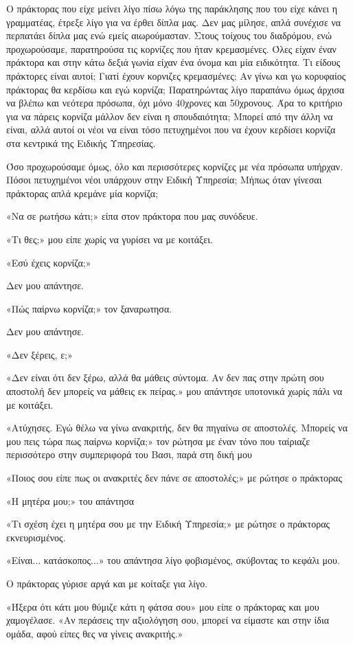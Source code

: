 \documentclass[12pt,twoside, openany]{book}
\begin{document}
Ο πράκτορας που είχε μείνει λίγο πίσω λόγω της παράκλησης που του είχε κάνει η γραμματέας, έτρεξε λίγο για να έρθει δίπλα μας. Δεν μας μίλησε, απλά συνέχισε να περπατάει δίπλα μας ενώ εμείς αιωρούμασταν. Στους τοίχους του διαδρόμου, ενώ προχωρούσαμε, παρατηρούσα τις κορνίζες που ήταν κρεμασμένες. Όλες είχαν έναν πράκτορα και στην κάτω δεξιά γωνία είχαν ένα όνομα και μία ειδικότητα. Τι είδους πράκτορες είναι αυτοί; Γιατί έχουν κορνιζες κρεμασμένες; Αν γίνω και γω κορυφαίος πράκτορας θα κερδίσω και εγώ κορνίζα; Παρατηρώντας λίγο παραπάνω όμως άρχισα να βλέπω και νεότερα πρόσωπα, όχι μόνο 40χρονες και 50χρονους. Άρα το κριτήριο για να πάρεις κορνίζα μάλλον δεν είναι η σπουδαιότητα; Μπορεί από την άλλη να είναι, αλλά αυτοί οι νέοι να είναι τόσο πετυχημένοι που να έχουν κερδίσει κορνίζα στα κεντρικά της Ειδικής Υπηρεσίας.

Όσο προχωρούσαμε όμως, όλο και περισσότερες κορνίζες με νέα πρόσωπα υπήρχαν. Πόσοι πετυχημένοι νέοι υπάρχουν στην Ειδική Υπηρεσία; Μήπως όταν γίνεσαι πράκτορας απλά κρεμάνε μία κορνίζα;

«Να σε ρωτήσω κάτι;» είπα στον πράκτορα που μας συνόδευε.

«Τι θες;» μου είπε χωρίς να γυρίσει να με κοιτάξει.

«Εσύ έχεις κορνίζα;»

Δεν μου απάντησε.

«Πώς παίρνω κορνίζα;» τον ξαναρωτησα.

Δεν μου απάντησε.

«Δεν ξέρεις, ε;»

«Δεν είναι ότι δεν ξέρω, αλλά θα μάθεις σύντομα. Αν δεν πας στην πρώτη σου αποστολή δεν μπορείς να μάθεις εκ πείρας.» μου απάντησε υποτονικά χωρίς πάλι να με κοιτάξει.

«Ατύχησες. Εγώ θέλω να γίνω ανακριτής, δεν θα πηγαίνω σε αποστολές. Μπορείς να μου πεις τώρα πως παίρνω κορνίζα;» τον ρώτησα με έναν τόνο που ταίριαζε περισσότερο στην συμπεριφορά του Βασι, παρά στη δική μου

«Ποιος σου είπε πως οι ανακριτές δεν πάνε σε αποστολές;» με ρώτησε ο πράκτορας

«Η μητέρα μου;» του απάντησα

«Τι σχέση έχει η μητέρα σου με την Ειδική Υπηρεσία;» με ρώτησε ο πράκτορας εκνευρισμένος.

«Είναι... κατάσκοπος...» του απάντησα λίγο φοβισμένος, σκύβοντας το κεφάλι μου.

Ο πράκτορας γύρισε αργά και με κοίταξε για λίγο.

«Ήξερα ότι κάτι μου θύμιζε κάτι η φάτσα σου» μου είπε ο πράκτορας και μου χαμογέλασε. «Αν περάσεις την αξιολόγηση σου, μπορεί να είμαστε και στην ίδια ομάδα, αφού είπες θες να γίνεις ανακριτής.»
\end{document}
